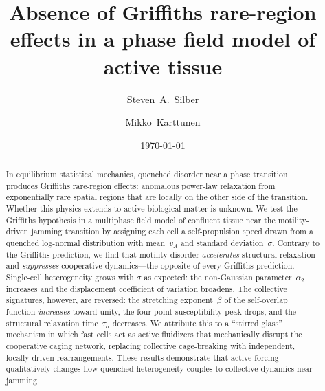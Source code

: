 \documentclass[aps,pre,twocolumn,superscriptaddress,longbibliography,floatfix]{revtex4-2}
\begin{document}
\title{Absence of Griffiths rare-region effects in a phase field model of active tissue}

\author{Steven~A.~Silber}

\author{Mikko~Karttunen}

\date{\today}

\begin{abstract}
In equilibrium statistical mechanics, quenched disorder near a phase
transition produces Griffiths rare-region effects: anomalous power-law
relaxation from exponentially rare spatial regions that are locally on
the other side of the transition.  Whether this physics extends to
active biological matter is unknown.  We test the Griffiths hypothesis
in a multiphase field model of confluent tissue near the
motility-driven jamming transition by assigning each cell a
self-propulsion speed drawn from a quenched log-normal distribution
with mean~$\bar{v}_A$ and standard deviation~$\sigma$.  Contrary to
the Griffiths prediction, we find that motility disorder
\emph{accelerates} structural relaxation and \emph{suppresses}
cooperative dynamics---the opposite of every Griffiths prediction.
Single-cell
heterogeneity grows with $\sigma$ as expected: the non-Gaussian
parameter~$\alpha_2$ increases and the
displacement coefficient of variation broadens.  The collective
signatures, however, are reversed: the stretching exponent~$\beta$ of
the self-overlap function \emph{increases} toward unity, the
four-point susceptibility peak drops, and the
structural relaxation time~$\tau_\alpha$ decreases.  We attribute this to a ``stirred glass'' mechanism in
which fast cells act as active fluidizers that mechanically disrupt the
cooperative caging network, replacing collective cage-breaking with
independent, locally driven rearrangements.  These results demonstrate
that active forcing qualitatively changes how quenched heterogeneity
couples to collective dynamics near jamming.
\end{abstract}
\end{document}
